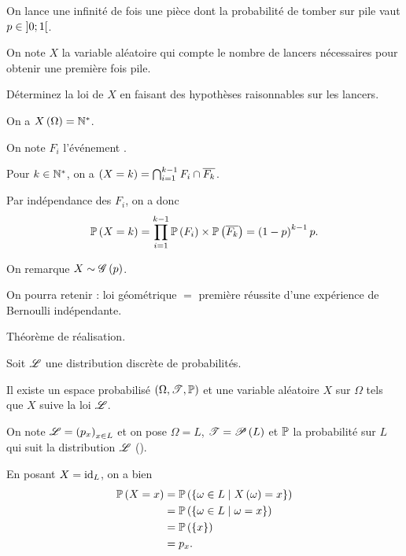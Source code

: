 \begin{exo}
On lance une infinité de fois une pièce dont la probabilité de tomber sur pile vaut \(p\in\left]0;1\right[\).

On note \(X\) la variable aléatoire qui compte le nombre de lancers nécessaires pour obtenir une première fois pile.

Déterminez la loi de \(X\) en faisant des hypothèses raisonnables sur les lancers.
\end{exo}

\begin{corr}
On a \(X\left(\Omega\right)=\mathbb{N}^*\).

On note \(F_i\) l'événement .

Pour \(k\in\mathbb{N}^*\), on a \(\left(X=k\right)=\bigcap_{i=1}^{k-1}F_i\cap\overline{F_k}\).

Par indépendance des \(F_i\), on a donc \[\mathbb{P}\left(X=k\right)=\prod_{i=1}^{k-1}\mathbb{P}\left(F_i\right)\times\mathbb{P}\left(\overline{F_k}\right)=\left(1-p\right)^{k-1}p.\]

On remarque \(X\sim\mathscr{G}\left(p\right)\).

On pourra retenir : \color{red}loi géométrique \(=\) première réussite d'une expérience de Bernoulli indépendante.\color{black}
\end{corr}

Théorème de réalisation.

\begin{theo}
Soit \(\mathscr{L}\) une distribution discrète de probabilités.

Il existe un espace probabilisé \(\anneau{\Omega}[\fami{T}][\prem]\) et une variable aléatoire \(X\) sur \(\Omega\) tels que \(X\) suive la loi \(\mathscr{L}\).
\end{theo}

\begin{dem}
On note \(\mathscr{L}=\left(p_x\right)_{x\in L}\) et on pose \(\Omega=L\), \(\mathscr{T}=\mathscr{P}\left(L\right)\) et \(\mathbb{P}\) la probabilité sur \(L\) qui suit la distribution \(\mathscr{L}\) (\cf {}).

En posant \(X=\mathrm{id}_{L}\), on a bien \[\begin{aligned}
\mathbb{P}\left(X=x\right)&=\mathbb{P}\left(\left\lbrace\omega\in L\;\middle|\; X\left(\omega\right)=x\right\rbrace\right) \\
&=\mathbb{P}\left(\left\lbrace\omega\in L\;\middle|\;\omega=x\right\rbrace\right) \\
&=\mathbb{P}\left(\left\lbrace x\right\rbrace\right) \\
&=p_x.
\end{aligned}\]
\end{dem}


